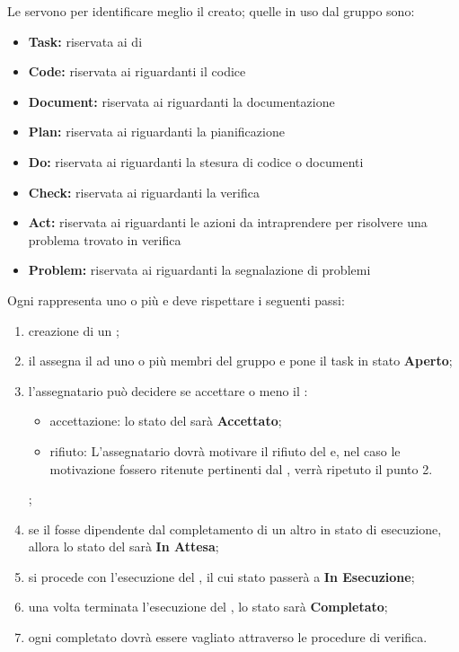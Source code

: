 \documentclass[12pt,a4paper]{article}
\begin{document}
\label{ticketEtichette}
Le  servono per identificare meglio il  creato; quelle in uso dal gruppo sono:
\begin{itemize}

	\item \textbf{Task:} riservata ai  di 
	\item \textbf{Code:} riservata ai  riguardanti il codice
	\item \textbf{Document:} riservata ai  riguardanti la documentazione
	\item \textbf{Plan:} riservata ai  riguardanti la pianificazione
	\item \textbf{Do:} riservata ai  riguardanti la stesura di codice o documenti
	\item \textbf{Check:} riservata ai  riguardanti la verifica
	\item \textbf{Act:} riservata ai  riguardanti le azioni da intraprendere per risolvere una problema trovato in verifica
	\item \textbf{Problem:} riservata ai  riguardanti la segnalazione di problemi
	
\end{itemize}

\label{ticketCicloVita}
Ogni  rappresenta uno o più  e deve rispettare i seguenti passi:
\begin{enumerate}
	\item creazione di un ;
	\item il \PM{} assegna il  ad uno o più membri del gruppo e pone il task in stato \textbf{Aperto};

    \item l'assegnatario può decidere se accettare o meno il :
	\begin{itemize}
		\item accettazione: lo stato del  sarà \textbf{Accettato};
		\item rifiuto: L'assegnatario dovrà motivare il rifiuto del  e, nel caso le motivazione fossero ritenute pertinenti dal \PM{}, verrà ripetuto il punto 2.
	\end{itemize};
	\item se il  fosse dipendente dal completamento di un altro  in stato di esecuzione, allora lo stato del  sarà \textbf{In Attesa};
	\item si procede con l'esecuzione del , il cui stato passerà a \textbf{In Esecuzione};
	\item una volta terminata l'esecuzione del , lo stato sarà \textbf{Completato};
	\item ogni  completato dovrà essere vagliato attraverso le procedure di verifica.
\end{enumerate}
\end{document}
